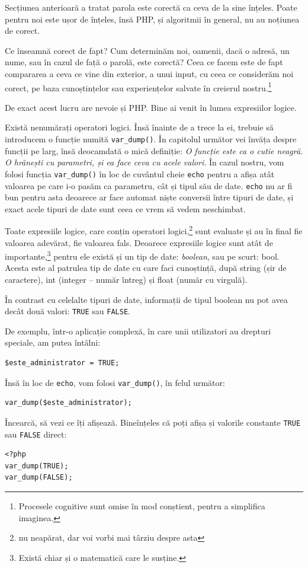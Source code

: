 Secțiunea anterioară a tratat {\glqq}parola este corectă{\grqq} ca ceva
de la sine înțeles. Poate pentru noi este ușor de înțeles,
însă PHP, și algoritmii în general, nu au noțiunea de {\glqq}corect{\grqq}.

Ce înseamnă {\glqq}corect{\grqq} de fapt? Cum determinăm noi, oamenii,
dacă o adresă, un nume, sau în cazul de față o parolă, este corectă?
Ceea ce facem este de fapt compararea a ceva ce vine din exterior, a
unui input, cu ceea ce considerăm noi {\glqq}corect{\grqq}, pe baza cunoștințelor
sau experiențelor {\glqq}salvate{\grqq} în creierul nostru.\footnote{Procesele
cognitive sunt omise în mod conștient, pentru a simplifica imaginea.}

De exact acest lucru are nevoie și PHP. Bine ai venit în lumea
expresiilor logice. 

Există nenumărați operatori logici. Însă înainte de a trece
la ei, trebuie să introducem o funcție numită \texttt{var\_dump()}.
În capitolul următor vei învăța despre funcții pe larg,
însă deocamdată o mică definiție: \textit{O funcție este
ca o {\glqq}cutie neagră{\grqq}. O hrănești cu parametri, și ea face ceva cu
acele valori}. În cazul nostru, vom folosi funcția \texttt{var\_dump()}
în loc de cuvântul cheie \texttt{echo} pentru a afișa atât valoarea
pe care i-o pasăm ca parametru, cât și tipul său de date. \texttt{echo}
nu ar fi bun pentru asta deoarece ar face automat niște conversii
între tipuri de date, și exact acele tipuri de date sunt ceea ce
vrem să vedem neschimbat.


Toate expresiile logice, care conțin operatori
logici,\footnote{nu neapărat, dar voi vorbi mai târziu
despre asta} sunt evaluate și au în final
fie valoarea {\glqq}adevărat{\grqq}, fie valoarea {\glqq}fals{\grqq}. Deoarece
expresiile logice sunt atât de importante,\footnote{Există
chiar și o matematică care le susține.}
pentru ele există și un tip de date: \textsl{boolean}, sau pe scurt: bool.
Acesta este al patrulea tip de date cu care faci cunoștință, după
string (șir de caractere), int (integer -- număr întreg)
și float (număr cu virgulă).

În contrast cu celelalte tipuri de date, informații de tipul
boolean nu pot avea decât două valori: \texttt{TRUE} sau \texttt{FALSE}.

De exemplu, într-o aplicație complexă, în care unii utilizatori
au drepturi speciale, am putea întâlni:
\begin{lstlisting}
$este_administrator = TRUE;
\end{lstlisting}
Însă în loc de \texttt{echo}, vom folosi \texttt{var\_dump()}, în felul următor:
\begin{lstlisting}[firstnumber=2]
var_dump($este_administrator);
\end{lstlisting}
Încearcă, să vezi ce îți afișează. Bineînțeles că poți afișa și valorile
constante \texttt{TRUE} sau \texttt{FALSE} direct:
\begin{lstlisting}
<?php
var_dump(TRUE);
var_dump(FALSE);
\end{lstlisting}

